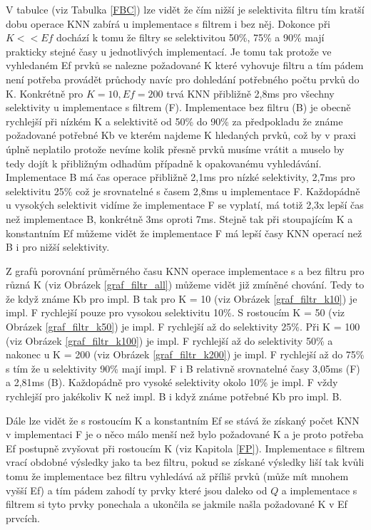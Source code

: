 \documentclass[czech,semestral,dept460,male,csharp,cpdeclaration]{diploma}
\begin{document}
		V tabulce (viz Tabulka \ref{FBC}) lze vidět že čím nižší je selektivita filtru tím kratší dobu operace KNN zabírá u implementace s filtrem i bez něj. Dokonce při $K << Ef$ dochází k tomu že filtry se selektivitou 50\%, 75\% a 90\% mají prakticky stejné časy u jednotlivých implementací. Je tomu tak protože ve vyhledaném Ef prvků se nalezne požadované K které vyhovuje filtru a tím pádem není potřeba provádět průchody navíc pro dohledání potřebného počtu prvků do K. Konkrétně pro $K = 10, Ef = 200$ trvá KNN přibližně 2,8ms pro všechny selektivity u implementace s filtrem (F). Implementace bez filtru (B) je obecně rychlejší při nízkém K a selektivitě od 50\% do 90\% za předpokladu že známe požadované potřebné Kb ve kterém najdeme K hledaných prvků, což by v praxi úplně neplatilo protože nevíme kolik přesně prvků musíme vrátit a muselo by tedy dojít k přibližným odhadům případně k opakovanému vyhledávání. Implementace B má čas operace přibližně 2,1ms pro nízké selektivity, 2,7ms pro selektivitu 25\% což je srovnatelné s časem 2,8ms u implementace F. Každopádně u vysokých selektivit vidíme že implementace F se vyplatí, má totiž 2,3x lepší čas než implementace B, konkrétně 3ms oproti 7ms. Stejně tak při stoupajícím K a konstantním Ef můžeme vidět že implementace F má lepší časy KNN operací než B i pro nižší selektivity.
		
		Z grafů porovnání průměrného času KNN operace implementace s a bez filtru pro různá K (viz Obrázek \ref{graf_filtr_all}) můžeme vidět již zmíněné chování. Tedy to že když známe Kb pro impl. B tak pro K = 10 (viz Obrázek \ref{graf_filtr_k10}) je impl. F rychlejší pouze pro vysokou selektivitu 10\%. S rostoucím K = 50 (viz Obrázek \ref{graf_filtr_k50}) je impl. F rychlejší až do selektivity  25\%. Při K = 100 (viz Obrázek \ref{graf_filtr_k100}) je impl. F rychlejší až do selektivity 50\% a nakonec u K = 200 (viz Obrázek \ref{graf_filtr_k200}) je impl. F rychlejší až do 75\% s tím že u selektivity 90\% mají impl. F i B relativně srovnatelné časy 3,05ms (F) a 2,81ms (B). Každopádně pro vysoké selektivity okolo 10\% je impl. F vždy rychlejší pro jakékoliv K než impl. B i když známe potřebné Kb pro impl. B.
		
		Dále lze vidět že s rostoucím K a konstantním Ef se stává že získaný počet KNN v implementaci F je o něco málo menší než bylo požadované K a je proto potřeba Ef postupně zvyšovat při rostoucím K (viz Kapitola \ref{FP}). Implementace s filtrem vrací obdobné výsledky jako ta bez filtru, pokud se získané výsledky liší tak kvůli tomu že implementace bez filtru vyhledává až příliš prvků (může mít mnohem vyšší Ef) a tím pádem zahodí ty prvky které jsou daleko od $Q$ a implementace s filtrem si tyto prvky ponechala a ukončila se jakmile našla požadované K v Ef prvcích.
		
\end{document}
